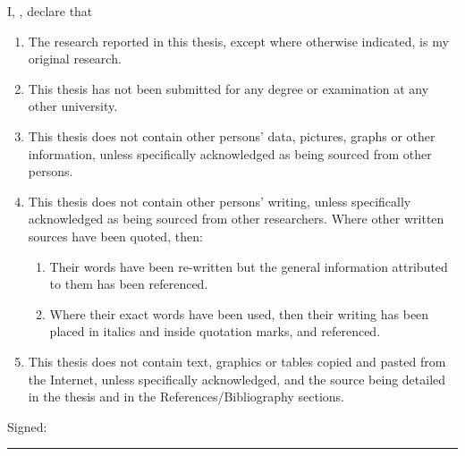 \documentclass[
11pt, %
english, %
singlespacing, %
liststotoc, %
headsepline, %
]{MastersDoctoralThesis} %
\begin{document}
\begin{declarationplagiarism}
	I, \authorname, declare that
	\begin{enumerate}
		\item The research reported in this thesis, except where otherwise indicated, is my original research.
		
		\item This thesis has not been submitted for any degree or examination at any other university.
		
		\item This thesis does not contain other persons' data, pictures, graphs or other information, unless specifically acknowledged as being sourced from other persons.
		
		\item This thesis does not contain other persons' writing, unless specifically acknowledged as being sourced from other researchers. Where other written sources have been quoted, then:
		\begin{enumerate}
			\item Their words have been re-written but the general information attributed to them has been referenced.
			
			\item Where their exact words have been used, then their writing has been placed in italics and inside quotation marks, and referenced.
		\end{enumerate}
	
		\item This thesis does not contain text, graphics or tables copied and pasted from the Internet, unless specifically acknowledged, and the source being detailed in the thesis and in the References/Bibliography sections.\\
	\end{enumerate}

	\noindent Signed:\\
	\rule[0.5em]{25em}{0.5pt} %
\end{declarationplagiarism}

\cleardoublepage


\vspace*{0.2\textheight}

\end{document}
